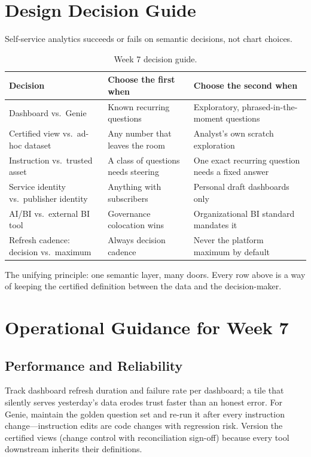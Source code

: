 \section{Design Decision Guide}
%
Self-service analytics succeeds or fails on semantic decisions, not chart choices.

\begin{table}[H]
\centering
\small
\begin{tabular}{@{}p{3.4cm}p{4.4cm}p{4.6cm}@{}}
\toprule
\textbf{Decision} & \textbf{Choose the first when} & \textbf{Choose the second when} \\
\midrule
Dashboard vs.\ Genie & Known recurring questions & Exploratory, phrased-in-the-moment questions \\
Certified view vs.\ ad-hoc dataset & Any number that leaves the room & Analyst's own scratch exploration \\
Instruction vs.\ trusted asset & A class of questions needs steering & One exact recurring question needs a fixed answer \\
Service identity vs.\ publisher identity & Anything with subscribers & Personal draft dashboards only \\
AI/BI vs.\ external BI tool & Governance colocation wins & Organizational BI standard mandates it \\
Refresh cadence: decision vs.\ maximum & Always decision cadence & Never the platform maximum by default \\
\bottomrule
\end{tabular}
\caption{Week 7 decision guide.}
\label{tab:ch7-decisions}
\end{table}

The unifying principle: one semantic layer, many doors. Every row above is a way of keeping the certified definition between the data and the decision-maker.

\section{Operational Guidance for Week 7}
%
\subsection{Performance and Reliability}
Track dashboard refresh duration and failure rate per dashboard; a tile that silently serves yesterday's data erodes trust faster than an honest error. For Genie, maintain the golden question set and re-run it after every instruction change---instruction edits are code changes with regression risk. Version the certified views (change control with reconciliation sign-off) because every tool downstream inherits their definitions.

